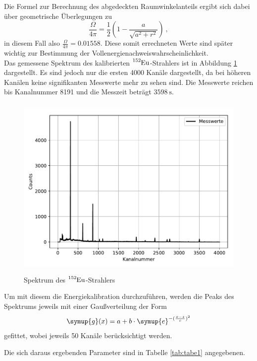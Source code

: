 Die Formel zur Berechnung des abgedeckten Raumwinkelanteils ergibt sich dabei
über geometrische Überlegungen zu
\begin{equation}
  \frac{\Omega}{4\pi}= \frac{1}{2}(1-\frac{a}{\sqrt{a^2+r^2}})   \: ,
\end{equation}
in diesem Fall also $\frac{\Omega}{4\pi}= 0.01558$.
Diese somit errechneten Werte sind später wichtig zur Bestimmung der Vollenergienachweiswahrscheinlichkeit. \\
Das gemessene Spektrum des kalibrierten $\ce{^{152}Eu}$-Strahlers ist in Abbildung
\ref{fig:plot1} dargestellt. Es sind jedoch nur die ersten 4000 Kanäle dargestellt,
da bei höheren Kanälen keine signifikanten Messwerte mehr zu sehen sind. Die Messwerte
reichen bis Kanalnummer 8191 und die Messzeit beträgt $\SI{3598}{\second}$.
\begin{figure}
  \centering
  \includegraphics[height=9cm]{Eu.pdf}
  \caption{Spektrum des $\ce{^{152}Eu}$-Strahlers}
  \label{fig:plot1}
\end{figure}

Um mit diesem die Energiekalibration durchzuführen, werden die Peaks des Spektrums
jeweils mit einer Gaußverteilung der Form
\begin{equation}
  \symup{g} (x) = a + b \cdot \symup{e}^{-(\frac{x-z}{c})^2}
  \label{eqn:gausk}
\end{equation}
gefittet, wobei jeweils 50 Kanäle berücksichtigt werden.

Die sich daraus ergebenden Parameter sind in Tabelle \ref{tab:tabe1} angegebenen.


